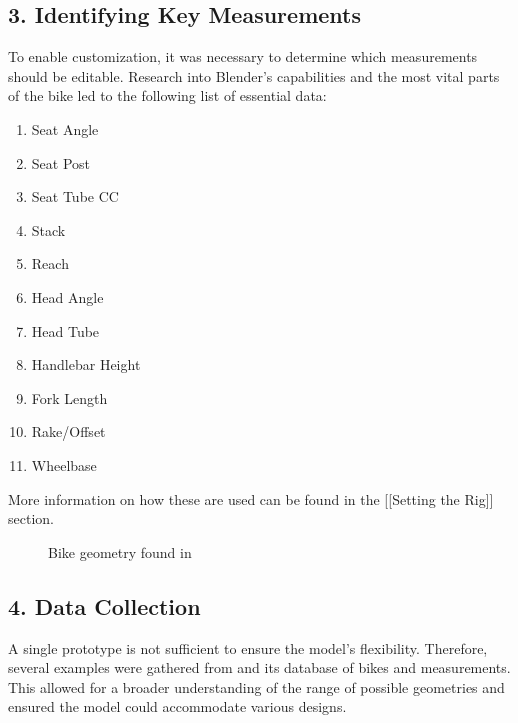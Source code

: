 \documentclass[letterpaper,10pt,english]{jupyterBook}
\begin{document}
\subsection{3. Identifying Key Measurements}
\label{\detokenize{Research:identifying-key-measurements}}
\sphinxAtStartPar
To enable customization, it was necessary to determine which measurements should be editable. Research into Blender’s capabilities and the most vital parts of the bike led to the following list of essential data:
\begin{enumerate}
%
\item {} 
\sphinxAtStartPar
Seat Angle

\item {} 
\sphinxAtStartPar
Seat Post

\item {} 
\sphinxAtStartPar
Seat Tube C\sphinxhyphen{}C

\item {} 
\sphinxAtStartPar
Stack

\item {} 
\sphinxAtStartPar
Reach

\item {} 
\sphinxAtStartPar
Head Angle

\item {} 
\sphinxAtStartPar
Head Tube

\item {} 
\sphinxAtStartPar
Handlebar Height

\item {} 
\sphinxAtStartPar
Fork Length

\item {} 
\sphinxAtStartPar
Rake/Offset

\item {} 
\sphinxAtStartPar
Wheelbase

\end{enumerate}

\sphinxAtStartPar
More information on how these are used can be found in the {[}{[}Setting the Rig{]}{]} section.

\begin{figure}[htbp]
\centering
\capstart

\noindent{}
\caption{Bike geometry found in }\label{\detokenize{Research:bike-geometry}}\end{figure}


\subsection{4. Data Collection}
\label{\detokenize{Research:data-collection}}
\sphinxAtStartPar
A single prototype is not sufficient to ensure the model’s flexibility. Therefore, several examples were gathered from  and its database of bikes and measurements. This allowed for a broader understanding of the range of possible geometries and ensured the model could accommodate various designs.
\end{document}
